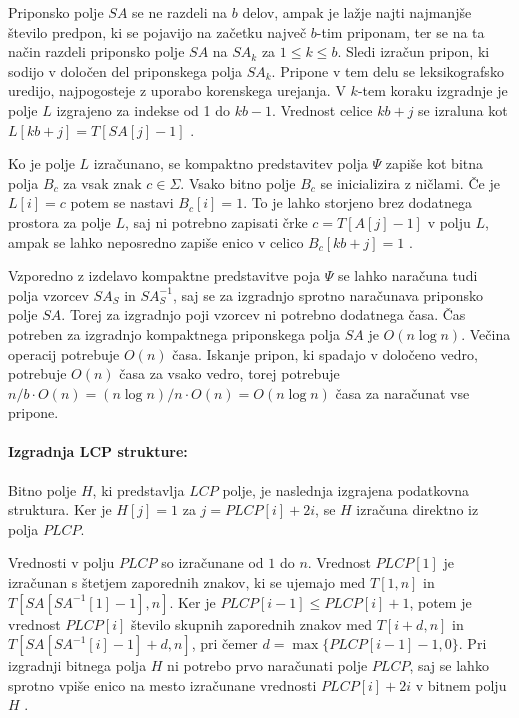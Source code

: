 Priponsko polje $SA$ se ne razdeli na $b$ delov, ampak je lažje najti najmanjše število predpon, ki se pojavijo na začetku največ $b$-tim priponam, ter se na ta način razdeli priponsko polje $SA$ na $SA_k$ za $1\le k\le b$. Sledi izračun pripon, ki sodijo v določen del priponskega polja $SA_k$. Pripone v tem delu se leksikografsko uredijo, najpogosteje z uporabo korenskega urejanja. V $k$-tem koraku izgradnje je polje $L$ izgrajeno za indekse od 1 do $kb-1$. Vrednost celice $kb+j$ se izraluna kot  $L[kb+j]=T[SA[j]-1]$ \cite{Navarro2016}.

Ko je polje $L$ izračunano, se kompaktno predstavitev polja $\Psi$ zapiše kot bitna polja $B_c$ za vsak znak $c\in \Sigma$. Vsako bitno polje $B_c$ se inicializira z ničlami. Če je $L[i]=c$ potem se nastavi $B_c[i]=1$. To je lahko storjeno brez dodatnega prostora za polje $L$, saj ni potrebno zapisati črke $c=T[A[j]-1]$ v polju $L$, ampak se lahko neposredno zapiše enico v celico $B_c[kb+j]=1$ \cite{Navarro2016}.

Vzporedno z izdelavo kompaktne predstavitve poja $\Psi$ se lahko naračuna tudi polja vzorcev $SA_S$ in $SA_S^{-1}$, saj se za izgradnjo sprotno naračunava priponsko polje $SA$. Torej za izgradnjo poji vzorcev ni potrebno dodatnega časa. Čas potreben za izgradnjo kompaktnega priponskega polja $SA$ je $O(n\log{n})$. Večina operacij potrebuje $O(n)$ časa. Iskanje pripon, ki spadajo v določeno vedro, potrebuje $O(n)$ časa za vsako vedro, torej potrebuje $n/b\cdot O(n)=(n\log{n})/n\cdot O(n)=O(n\log{n})$ časa za naračunat vse pripone. 

\paragraph{Izgradnja LCP strukture:}
Bitno polje $H$, ki predstavlja $LCP$ polje, je naslednja izgrajena podatkovna struktura. Ker je $H[j]=1$ za $j=PLCP[i]+2i$, se $H$ izračuna direktno iz polja $PLCP$.

Vrednosti v polju $PLCP$ so izračunane od $1$ do $n$. Vrednost $PLCP[1]$ je izračunan s štetjem zaporednih znakov, ki se ujemajo med $T[1,n]$ in $T[SA[SA^{-1}[1]-1],n]$. Ker je $PLCP[i-1]\le PLCP[i]+1$, potem je vrednost $PLCP[i]$ število skupnih zaporednih znakov med $T[i+d,n]$ in $T[SA[SA^{-1}[i]-1]+d,n]$, pri čemer $d=\max\{PLCP[i-1]-1,0\}$.
Pri izgradnji bitnega polja $H$ ni potrebo prvo naračunati polje $PLCP$, saj se lahko sprotno vpiše enico na mesto izračunane vrednosti $PLCP[i]+2i$ v bitnem polju $H$ \cite{Navarro2016}.

